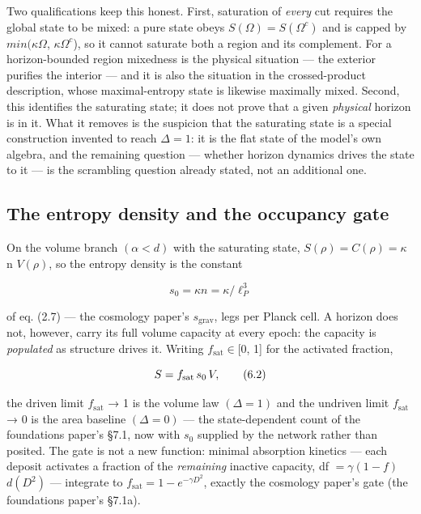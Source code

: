 \documentclass[12pt]{iopart}
\begin{document}
Two qualifications keep this honest. First, saturation of \emph{every}
cut requires the global state to be mixed: a pure state obeys
\(S(\Omega ) = S(\Omega ^{c})\) and is capped by
\(min(\kappa\)\textbar{}\(\Omega\)\textbar,
\(\kappa\)\textbar{}\(\Omega ^{c}\)\textbar), so it cannot saturate both
a region and its complement. For a horizon-bounded region mixedness is
the physical situation --- the exterior purifies the interior --- and it
is also the situation in the crossed-product description, whose
maximal-entropy state is likewise maximally mixed. Second, this
identifies the saturating state; it does not prove that a given
\emph{physical} horizon is in it. What it removes is the suspicion that
the saturating state is a special construction invented to reach
\(\Delta  = 1\): it is the flat state of the model's own algebra, and
the remaining question --- whether horizon dynamics drives the state to
it --- is the scrambling question already stated, not an additional one.

\subsection{The entropy density and the occupancy gate}\label{sec-6-2}

On the volume branch \((\alpha  < d)\) with the saturating state,
\(S(\rho ) = C(\rho ) = \kappa\) n \(V(\rho )\), so the entropy density
is the constant

\[s_0 = \kappa n = \kappa/\ell_P^3 \tag{6.1}\]

of eq. (2.7) --- the cosmology paper's \(s_{\mathrm{grav}}\), legs per
Planck cell. A horizon does not, however, carry its full volume capacity
at every epoch: the capacity is \emph{populated} as structure drives it.
Writing \(f_{\mathrm{sat}} \in  [0\), 1{]} for the activated fraction,

\[S = f_{\rm sat}\, s_0\, V, \tag{6.2}\]

the driven limit \(f_{\mathrm{sat}}\) → 1 is the volume law
\((\Delta  = 1)\) and the undriven limit \(f_{\mathrm{sat}}\) → 0 is the
area baseline \((\Delta  = 0)\) --- the state-dependent count of the
foundations paper's §7.1, now with \(s_{0}\) supplied by the network
rather than posited. The gate is not a new function: minimal absorption
kinetics --- each deposit activates a fraction of the \emph{remaining}
inactive capacity, df \(= \gamma (1 - f)\) \(d(D^{2})\) --- integrate to
\(f_{\mathrm{sat}} = 1 - e^{-\gamma  D^{2}}\), exactly the cosmology
paper's gate (the foundations paper's §7.1a).
\end{document}
